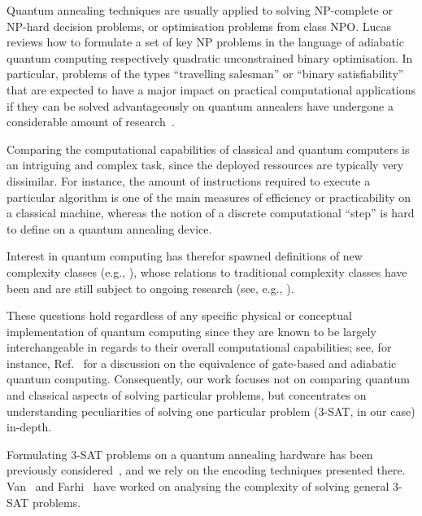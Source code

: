 Quantum annealing techniques are usually applied to solving NP-complete or NP-hard decision problems, or optimisation problems from class NPO. Lucas~\cite{lucas2014ising} reviews how to formulate a set of key NP problems in the language of adiabatic quantum computing respectively quadratic unconstrained binary optimisation. In particular, problems of the types ``travelling salesman'' or ``binary satisfiability'' that are expected to have a major impact on practical computational applications if they can be solved advantageously on quantum annealers have undergone a considerable amount of research~\cite{heim2017designing,warren2017small,moylett2017quantum,strand2017zzz,benjamin2017measurement}.

Comparing the computational capabilities of classical and quantum computers
is an intriguing and complex task, since the deployed ressources are typically very dissimilar. For instance, the amount of instructions required
to execute a particular algorithm is one of the main measures of efficiency
or practicability on a classical machine, whereas the notion of a discrete
computational ``step'' is hard to define on a quantum annealing device.

Interest in quantum computing has therefor spawned definitions of new complexity classes (e.g., \cite{klauck2017complexity,morimae2017merlinization}), whose relations to traditional complexity classes have been and are still subject to ongoing research (see, e.g., \cite{bernstein1997quantum,marriott2005quantum}).


These questions hold regardless of any specific physical or conceptual implementation of quantum computing since they are known to be largely interchangeable in regards to their overall computational capabilities; see, for instance, Ref.~\cite{mcgeoch2014adiabatic} for a discussion on the
equivalence of gate-based and adiabatic quantum computing. Consequently,
our work focuses not on comparing quantum and classical aspects of solving particular problems, but concentrates on understanding peculiarities
of solving one particular problem (3-SAT, in our case) in-depth.

Formulating 3-SAT problems on a quantum annealing hardware has been previously considered~\cite{choi2011different,choi2010adiabatic,farhi2000quantum}, and we rely on the encoding techniques presented there. Van~\cite{van2001powerful} and Farhi~\cite{farhi2009quantum} have worked on analysing the complexity of solving general 3-SAT problems.
